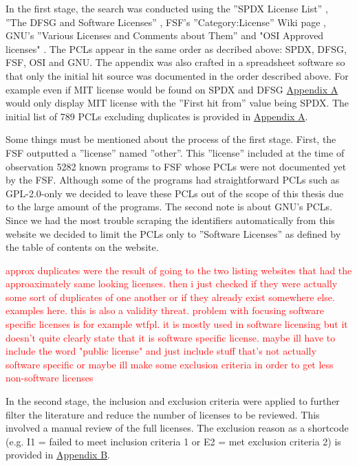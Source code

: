 In the first stage, the search was conducted using the ''SPDX License List'' \citep{spdx:licenses}, ''The DFSG and Software Licenses'' \citep{debian:dfsg}, FSF's ''Category:License'' Wiki page \citep{fsf:licenselist}, GNU's ''Various Licenses and Comments about Them'' \citep{gnu:licenselist} and "OSI Approved licenses" \citep{osi:licenselist}. The PCLs appear in the same order as decribed above: SPDX, DFSG, FSF, OSI and GNU. The appendix was also crafted in a spreadsheet software so that only the initial hit source was documented in the order described above. For example even if MIT license would be found on SPDX and DFSG \hyperref[appendix:a]{Appendix A} would only display MIT license with the ''First hit from'' value being SPDX. The initial list of 789 PCLs excluding duplicates is provided in \hyperref[appendix:a]{Appendix A}. %

Some things must be mentioned about the process of the first stage. First, the FSF outputted a ''license'' named ''other''. This ''license'' included at the time of observation 5282 known programs to FSF whose PCLs were not documented yet by the FSF. Although some of the programs had straightforward PCLs such as GPL-2.0-only we decided to leave these PCLs out of the scope of this thesis due to the large amount of the programs. The second note is about GNU's PCLs. Since we had the most trouble scraping the identifiers automatically from this website we decided to limit the PCLs only to ''Software Licenses'' as defined by the table of contents on the website.

\textcolor{red}{approx duplicates were the result of going to the two listing websites that had the approaximately same looking licenses. then i just checked if they were actually some sort of duplicates of one another or if they already exist somewhere else. examples here. this is also a validity threat. problem with focusing software specific licenses is for example wtfpl. it is mostly used in software licensing but it doesn't quite clearly state that it is software specific license. maybe ill have to include the word "public license" and just include stuff that's not actually software specific or maybe ill make some exclusion criteria in order to get less non-software licenses}

In the second stage, the inclusion and exclusion criteria were applied to further filter the literature and reduce the number of licenses to be reviewed. This involved a manual review of the full licenses. The exclusion reason as a shortcode (e.g. I1 = failed to meet inclusion criteria 1 or E2 = met exclusion criteria 2) is provided in \hyperref[appendix:b]{Appendix B}.

